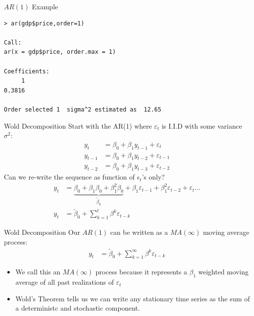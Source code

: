 \begin{frame}[fragile]{$AR(1)$ Example}
\begin{verbatim}
> ar(gdp$price,order=1)

Call:
ar(x = gdp$price, order.max = 1)

Coefficients:
     1  
0.3816  

Order selected 1  sigma^2 estimated as  12.65
\end{verbatim}
\end{frame}

\begin{frame}{Wold Decomposition}
Start with the AR(1) where $\varepsilon_{t}$ is I.I.D with some variance $\sigma^2$:
\begin{align*}
y_t &= \beta_0 + \beta_1 y_{t-1} + \varepsilon_t\\
y_{t-1} &= \beta_0 + \beta_1 y_{t-2} + \varepsilon_{t-1}\\
y_{t-2} &= \beta_0 + \beta_1 y_{t-3} + \varepsilon_{t-2}
\end{align*}
Can we re-write the sequence as function of $\epsilon_t$'s only?
\begin{align*}
y_t &= \underbrace{\beta_0 + \beta_1 \beta_0 + \beta_1^2 \beta_0}_{\widetilde{\beta}_0} + \beta_1 \varepsilon_{t-1} + \beta_1^2 \varepsilon_{t-2} +  \varepsilon_t \ldots \\
y_t &= \widetilde{\beta}_0 + \sum_{k=1}^{t} \beta^{k} \varepsilon_{t-k}
\end{align*}
\end{frame}


\begin{frame}{Wold Decomposition}
Our $AR(1)$ can be written as a $MA(\infty)$ \alert{moving average process}:
\begin{align*}
y_t &= \widetilde{\beta}_0 + \sum_{k=1}^{\infty} \beta^{k} \varepsilon_{t-k}
\end{align*}
\begin{itemize}
    \item We call this an $MA(\infty)$ process because it represents a $\beta_1$ weighted moving average of \alert{all past realizations} of $\varepsilon_t$
    \item Wold's Theorem tells us we can write any \alert{stationary} time series as the sum of a \alert{deterministc} and \alert{stochastic} component.
\end{itemize}
\end{frame}


